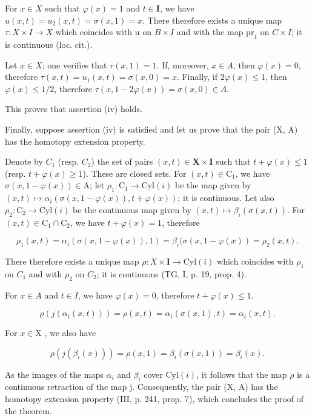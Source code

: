 For \(x\in X\) such that \(\varphi(x)=1\) and \(t\in\mathbf{I}\), we have \(u(x,t)=u_2(x,t)=\sigma(x,1)=x\). There therefore exists a unique map \(\tau:X\times I\to X\) which coincides with u on \(B\times I\) and with the map \(\mathrm{pr}_1\) on \(C\times I\); it is continuous (loc. cit.).

Let \(x \in X\); one verifies that \(\tau(x,1) = 1\). If, moreover, \(x \in A\), then \(\varphi(x) = 0\), therefore \(\tau(x,t) = u_{1}(x,t) = \sigma(x,0) = x\). Finally, if \(2\varphi(x) \leqslant 1\), then \(\varphi(x) \leqslant 1/2\), therefore \(\tau(x,1 - 2\varphi(x)) = \sigma(x,0) \in A\).

This proves that assertion (iv) holds.

Finally, suppose assertion (iv) is satisfied and let us prove that the pair (X, A) has the homotopy extension property.

Denote by \(C_{1}\) (resp. \(C_{2}\)) the set of pairs \((x,t)\in\mathbf{X}\times\mathbf{I}\) such that \(t+\varphi(x)\leqslant1\) (resp. \(t+\varphi(x)\geqslant1\)). These are closed sets. For \((x,t)\in\mathrm{C}_{1}\), we have \(\sigma(x,1-\varphi(x))\in\mathrm{A}\); let \(\rho_{1}\colon\mathrm{C}_{1}\to\mathrm{Cyl}(i)\) be the map given by \((x,t)\mapsto\alpha_{i}(\sigma(x,1-\varphi(x)),t+\varphi(x))\); it is continuous. Let also \(\rho_{2}\colon\mathrm{C}_{2}\to\mathrm{Cyl}(i)\) be the continuous map given by \((x,t)\mapsto\beta_{i}(\sigma(x,t))\). For \((x,t)\in\mathrm{C}_{1}\cap\mathrm{C}_{2}\), we have \(t+\varphi(x)=1\), therefore

\[
\rho_ {1} (x, t) = \alpha_ {i} (\sigma (x, 1 - \varphi (x)), 1) = \beta_ {i} (\sigma (x, 1 - \varphi (x)) = \rho_ {2} (x, t).
\]

There therefore exists a unique map \(\rho\colon X\times\mathbf{I}\to\mathrm{Cyl}(i)\) which coincides with \(\rho_{1}\) on \(C_{1}\) and with \(\rho_{2}\) on \(C_{2}\); it is continuous (TG, I, p. 19, prop. 4).

For \(x \in A\) and \(t \in I\), we have \(\varphi(x) = 0\), therefore \(t + \varphi(x) \leqslant 1\).

\[
\rho (j (\alpha_ {i} (x, t))) = \rho (x, t) = \alpha_ {i} (\sigma (x, 1), t) = \alpha_ {i} (x, t).
\]

For \(x\in \mathrm{X}\) , we also have

\[
\rho (j (\beta_ {i} (x))) = \rho (x, 1) = \beta_ {i} (\sigma (x, 1)) = \beta_ {i} (x).
\]

As the images of the maps \(\alpha_{i}\) and \(\beta_{i}\) cover \(\mathrm{Cyl}(i)\), it follows that the map \(\rho\) is a continuous retraction of the map j. Consequently, the pair (X, A) has the homotopy extension property (III, p. 241, prop. 7), which concludes the proof of the theorem.

